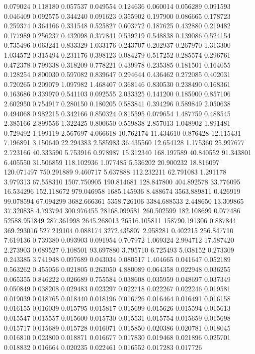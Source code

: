 0.079024
0.118180
0.057537
0.049554
0.124636
0.060014
0.056289
0.091593
0.046409
0.092575
0.344240
0.091623
0.355902
0.197900
0.086665
0.178723
0.259374
0.364166
0.331548
0.525827
0.603772
0.187625
0.432880
0.219482
0.177989
0.256237
0.432098
0.377841
0.539219
0.548838
0.139086
0.524154
0.735496
0.063241
0.833329
1.033176
0.243707
0.202937
0.267970
1.313300
1.034572
0.315494
0.231176
0.398123
0.084279
0.517252
0.285574
0.296761
0.472378
0.799338
0.318209
0.778221
0.439978
0.235385
0.181501
0.164055
0.128254
0.800030
0.597082
0.839647
0.294644
0.436462
0.272085
0.402031
0.720265
0.209079
1.097982
1.468407
0.368146
0.830530
0.238490
0.168361
0.163686
0.339970
0.541103
0.092555
2.033325
0.141200
0.185900
0.857106
2.602950
0.754917
0.280150
0.180205
0.583841
0.394296
0.589849
2.050638
0.494068
0.982215
0.342166
0.850324
0.815595
0.079654
1.487759
0.488545
2.385166
2.899556
1.322425
0.800650
0.559838
2.857013
1.048902
1.891481
0.729492
1.199119
2.567697
4.066618
10.762174
11.434610
0.876428
12.115431
7.196891
3.150640
22.294383
2.585983
36.435560
12.654128
1.175360
25.997677
2.723166
40.333590
5.753916
0.978987
15.312340
168.197589
40.840552
91.343801
6.405550
31.506859
118.102936
1.077485
5.536202
20.900232
18.816097
120.071497
750.291889
9.460717
5.637888
112.232211
62.791083
1.291178
3.979313
67.558310
1507.750905
190.814681
128.847800
404.892578
33.776095
16.534296
152.118672
979.046958
1685.145936
8.488674
3563.889811
0.426919
99.078594
67.094299
3682.666361
5358.726106
3384.688533
2.448650
13.309865
37.320838
4.793794
300.976455
28168.099581
260.502599
182.108699
0.077486
52588.951849
287.361998
2645.268013
26516.105811
158790.191306
0.887844
369.293016
527.219104
0.088174
3272.435807
2.958281
0.402215
256.847710
7.619136
0.739380
0.093903
0.091954
0.707972
1.069324
2.994712
17.587420
2.273903
0.089527
0.108501
93.697880
3.795710
6.725493
5.038152
0.273309
0.243385
3.741948
0.097689
0.043034
0.080517
1.404665
0.041647
0.052189
0.563262
0.455056
0.021805
0.263050
4.880089
0.064358
0.022948
0.036255
0.065355
0.846222
0.026689
0.755584
0.038608
0.035959
0.048697
0.037349
0.050849
0.038208
0.029483
0.023297
0.022718
0.022267
0.022246
0.019581
0.019039
0.018765
0.018440
0.018196
0.016726
0.016464
0.016491
0.016158
0.016155
0.016039
0.015795
0.015817
0.015699
0.015626
0.015594
0.015613
0.015547
0.015557
0.015600
0.015730
0.015531
0.015754
0.015659
0.015698
0.015717
0.015689
0.015728
0.016071
0.015850
0.020386
0.020781
0.018045
0.016810
0.023800
0.018871
0.016677
0.017830
0.019468
0.021896
0.025701
0.018832
0.016664
0.020235
0.022461
0.016552
0.017283
0.017726
